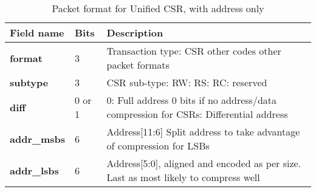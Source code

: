 \begin{table}[htp]
  \centering
  \caption{Packet format for Unified CSR, with address only}
  \label{tab:te_datadx0y10}
  \begin{tabulary}{\textwidth}{|l|p{40mm}|p{90mm}|}
    \hline
    {\bf Field name} & {\bf Bits} & {\bf Description} \\
    \hline
    \textbf{format} & 	3	& Transaction type: CSR\newline
		other codes other packet formats\\
    \hline
    \textbf{subtype} & 	3	& CSR sub-type: RW: RS: RC: reserved\\	
    \hline
    \textbf{diff} & 0 or 1 & 0: Full address 0 bits if no address/data compression for CSRs: Differential address\\
    \hline
    \textbf{addr\_msbs} & 6  &	Address[11:6]	Split address to take advantage of compression for LSBs\\
    \hline
    \textbf{addr\_lsbs} &  6 & Address[5:0], aligned and encoded as per size. Last as most likely to compress well \\
    \hline
  \end{tabulary}
\end{table}

